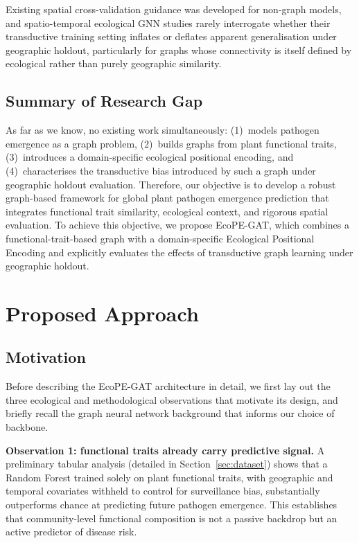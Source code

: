 \documentclass[a4paper,fleqn]{cas-sc}
\begin{document}
Existing spatial cross-validation guidance was developed for non-graph models, and spatio-temporal ecological GNN studies rarely interrogate whether their transductive training setting inflates or deflates apparent generalisation under geographic holdout, particularly for graphs whose connectivity is itself defined by ecological rather than purely geographic similarity.

\subsection{Summary of Research Gap}

As far as we know, no existing work simultaneously: (1)~models pathogen emergence as a graph problem, (2)~builds graphs from plant functional traits, (3)~introduces a domain-specific ecological positional encoding, and (4)~characterises the transductive bias introduced by such a graph under geographic holdout evaluation. Therefore, our objective is to develop a robust graph-based framework for global plant pathogen emergence prediction that integrates functional trait similarity, ecological context, and rigorous spatial evaluation. To achieve this objective, we propose EcoPE-GAT, which combines a functional-trait-based graph with a domain-specific Ecological Positional Encoding and explicitly evaluates the effects of transductive graph learning under geographic holdout.

\section{Proposed Approach}
\label{sec:approach}

\subsection{Motivation}
\label{sec:motivation}

Before describing the EcoPE-GAT architecture in detail, we first lay out the three ecological and methodological observations that motivate its design, and briefly recall the graph neural network background that informs our choice of backbone.

\textbf{Observation 1: functional traits already carry predictive signal.} A preliminary tabular analysis (detailed in Section~\ref{sec:dataset}) shows that a Random Forest trained solely on plant functional traits, with geographic and temporal covariates withheld to control for surveillance bias, substantially outperforms chance at predicting future pathogen emergence. This establishes that community-level functional composition is not a passive backdrop but an active predictor of disease risk.
\end{document}
